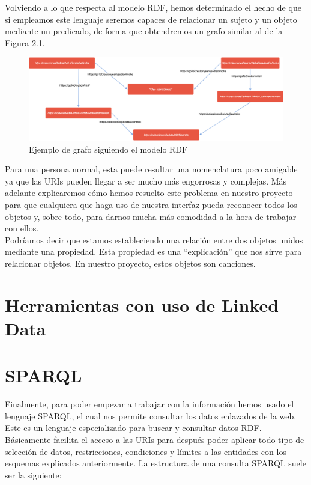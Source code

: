 Volviendo a lo que respecta al modelo RDF, hemos determinado el hecho de que si empleamos este lenguaje seremos capaces de relacionar un sujeto y un objeto mediante un predicado, de forma que obtendremos un grafo similar al de la Figura 2.1.\\

\begin{figure}[h!]
	\centering
	\includegraphics[width = 1\textwidth]{Imagenes/Bitmap/RDFexample.png}
	\caption{Ejemplo de grafo siguiendo el modelo RDF}
	\label{fig:sampleImage}
\end{figure}

Para una persona normal, esta puede resultar una nomenclatura poco amigable ya que las URIs pueden llegar a ser mucho más engorrosas y complejas. Más adelante explicaremos cómo hemos resuelto este problema en nuestro proyecto para que cualquiera que haga uso de nuestra interfaz pueda reconocer todos los objetos y, sobre todo, para darnos mucha más comodidad a la hora de trabajar con ellos.\\

Podríamos decir que estamos estableciendo una relación entre dos objetos unidos mediante una propiedad. Esta propiedad es una ``explicación'' que nos sirve para relacionar objetos. En nuestro proyecto, estos objetos son canciones.\\


\section{Herramientas con uso de Linked Data}


\section{SPARQL}

Finalmente, para poder empezar a trabajar con la información hemos usado el lenguaje SPARQL, el cual nos permite consultar los datos enlazados de la web. Este es un lenguaje especializado para buscar y consultar datos RDF. Básicamente facilita el acceso a las URIs para después poder aplicar todo tipo de selección de datos, restricciones, condiciones y límites a las entidades con los esquemas explicados anteriormente. La estructura de una consulta SPARQL suele ser la siguiente:\\

